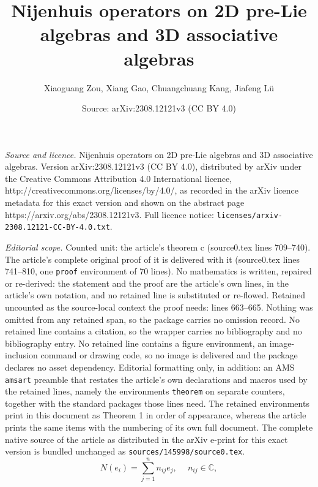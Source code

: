 \documentclass[10pt,a4paper]{amsart}
\title{Nijenhuis operators on 2D pre-Lie algebras and 3D associative algebras}
\author{Xiaoguang Zou, Xiang Gao, Chuangchuang Kang, Jiafeng L\"u}
\date{Source: arXiv:2308.12121v3 (CC BY 4.0)}
\begin{document}
\maketitle

\noindent\emph{Source and licence.} Nijenhuis operators on 2D pre-Lie algebras and 3D associative algebras. Version arXiv:2308.12121v3 (CC BY 4.0), distributed by arXiv under the Creative Commons Attribution 4.0 International licence, http://creativecommons.org/licenses/by/4.0/, as recorded in the arXiv licence metadata for this exact version and shown on the abstract page https://arxiv.org/abs/2308.12121v3. Full licence notice: \texttt{licenses/arxiv-2308.12121-CC-BY-4.0.txt}.\par\smallskip

\noindent\textit{Editorial scope.} Counted unit: the article's theorem c (source0.tex lines 709--740). The article's complete original proof of it is delivered with it (source0.tex lines 741--810, one \texttt{proof} environment of 70 lines). No mathematics is written, repaired or re-derived: the statement and the proof are the article's own lines, in the article's own notation, and no retained line is substituted or re-flowed.  Retained uncounted as the source-local context the proof needs: lines 663--665.  Nothing was omitted from any retained span, so the package carries no omission record.  No retained line contains a citation, so the wrapper carries no bibliography and no bibliography entry.  No retained line contains a figure environment, an image-inclusion command or drawing code, so no image is delivered and the package declares no asset dependency.  Editorial formatting only, in addition: an AMS \texttt{amsart} preamble that restates the article's own declarations and macros used by the retained lines, namely the environments \texttt{theorem} on separate counters, together with the standard packages those lines need.  The retained environments print in this document as Theorem 1 in order of appearance, whereas the article prints the same items with the numbering of its own full document.  The complete native source of the article as distributed in the arXiv e-print for this exact version is bundled unchanged as \texttt{sources/145998/source0.tex}.
\begin{equation}\label{eq:Nii-mulit}
  N\left(e_{i}\right)=\sum_{j=1}^{n} n_{i j} e_{j}, \quad ~n_{i j}\in\mathbb{C},
\end{equation}
\end{document}
